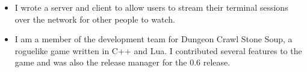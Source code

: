 \documentclass[letterpaper]{article}
\begin{document}
\begin{itemize}
    \item {} \vspace{6pt} \linebreak
        \small{I wrote a server and client to allow users to stream their terminal
        sessions over the network for other people to watch.}\normalsize
    \item {} \vspace{6pt} \linebreak
        \small{I am a member of the development team for Dungeon Crawl Stone Soup, a
        roguelike game written in C++ and Lua. I contributed several features
        to the game and was also the release manager for the 0.6 release.}\normalsize

\end{itemize}
\end{document}
